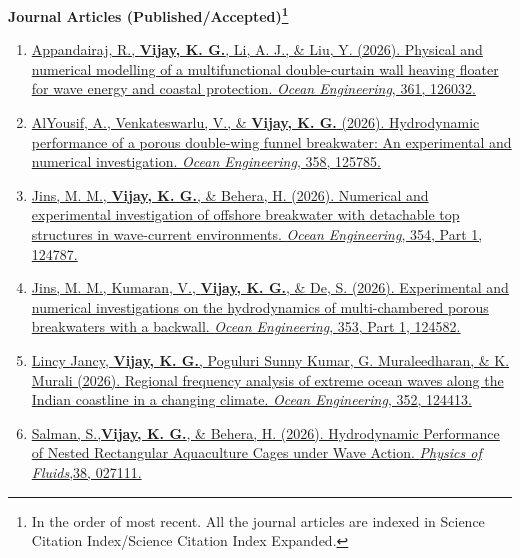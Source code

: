 
\newpage{}
\textbf{Journal Articles (Published/Accepted)\footnote{In the order of most recent. All the journal articles are indexed in Science Citation Index/Science Citation Index Expanded.}}

\begin{enumerate}[label=\protect\circled{\arabic*}]
    \justifying
    
 \item \href{https://doi.org/10.1016/j.oceaneng.2026.126032}{%
Appandairaj, R., \textbf{Vijay, K. G.}, Li, A. J., \& Liu, Y. (2026). Physical and numerical modelling of a multifunctional double-curtain wall heaving floater for wave energy and coastal protection. \textit{Ocean Engineering}, 361, 126032.}

 \item \href{https://doi.org/10.1016/j.oceaneng.2026.125785}{%
AlYousif, A., Venkateswarlu, V., \& \textbf{Vijay, K. G.} (2026). Hydrodynamic performance of a porous double-wing funnel breakwater: An experimental and numerical investigation. \textit{Ocean Engineering}, 358, 125785.}

\item \href{https://doi.org/10.1016/j.oceaneng.2026.124787}{%
Jins, M. M., \textbf{Vijay, K. G.}, \& Behera, H. (2026). Numerical and experimental investigation of offshore breakwater with detachable top structures in wave-current environments. \textit{Ocean Engineering}, 354, Part 1, 124787.}

\item \href{https://doi.org/10.1016/j.oceaneng.2026.124582}{%
Jins, M. M., Kumaran, V., \textbf{Vijay, K. G.}, \& De, S. (2026). Experimental and numerical investigations on the hydrodynamics of multi-chambered porous breakwaters with a backwall. \textit{Ocean Engineering}, 353, Part 1, 124582.}

\item \href{https://doi.org/10.1016/j.oceaneng.2026.124413}{%
 Lincy Jancy, \textbf{Vijay, K. G.}, Poguluri Sunny Kumar, G. Muraleedharan, \& K. Murali (2026). Regional frequency analysis of extreme ocean waves along the Indian coastline in a changing climate. \textit{Ocean Engineering}, 352, 124413.}

\item \href{https://doi.org/10.1063/5.0313865}{%
Salman, S.,\textbf{Vijay, K. G.}, \& Behera, H. (2026). Hydrodynamic Performance of Nested Rectangular Aquaculture Cages under Wave Action. \textit{Physics of Fluids},38, 027111.}


\end{enumerate}
